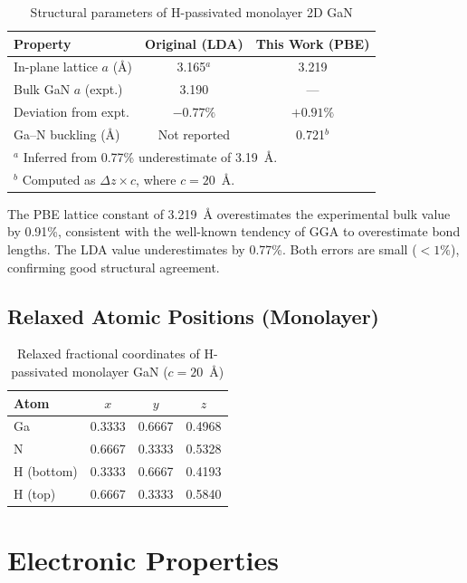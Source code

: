 \documentclass[11pt]{article}
\begin{document}
\begin{table}[H]
\centering
\caption{Structural parameters of H-passivated monolayer 2D GaN}
\label{tab:mono_structure}
\begin{tabular}{@{}lcc@{}}
\toprule
\textbf{Property} & \textbf{Original (LDA)} & \textbf{This Work (PBE)} \\
\midrule
In-plane lattice $a$ (\AA) & 3.165$^a$ & 3.219 \\
Bulk GaN $a$ (expt.) & 3.190 & --- \\
Deviation from expt. & $-0.77\%$ & $+0.91\%$ \\
Ga--N buckling (\AA) & Not reported & 0.721$^b$ \\
\bottomrule
\multicolumn{3}{l}{\footnotesize $^a$ Inferred from 0.77\% underestimate of 3.19~\AA.} \\
\multicolumn{3}{l}{\footnotesize $^b$ Computed as $\Delta z \times c$, where $c = 20$~\AA.} \\
\end{tabular}
\end{table}

The PBE lattice constant of 3.219~\AA{} overestimates the experimental bulk value by 0.91\%, consistent with the well-known tendency of GGA to overestimate bond lengths. The LDA value underestimates by 0.77\%. Both errors are small ($< 1\%$), confirming good structural agreement.

\subsection{Relaxed Atomic Positions (Monolayer)}

\begin{table}[H]
\centering
\caption{Relaxed fractional coordinates of H-passivated monolayer GaN ($c = 20$~\AA)}
\label{tab:mono_coords}
\begin{tabular}{@{}lccc@{}}
\toprule
\textbf{Atom} & $x$ & $y$ & $z$ \\
\midrule
Ga & 0.3333 & 0.6667 & 0.4968 \\
N  & 0.6667 & 0.3333 & 0.5328 \\
H (bottom) & 0.3333 & 0.6667 & 0.4193 \\
H (top) & 0.6667 & 0.3333 & 0.5840 \\
\bottomrule
\end{tabular}
\end{table}

\section{Electronic Properties}
\end{document}

